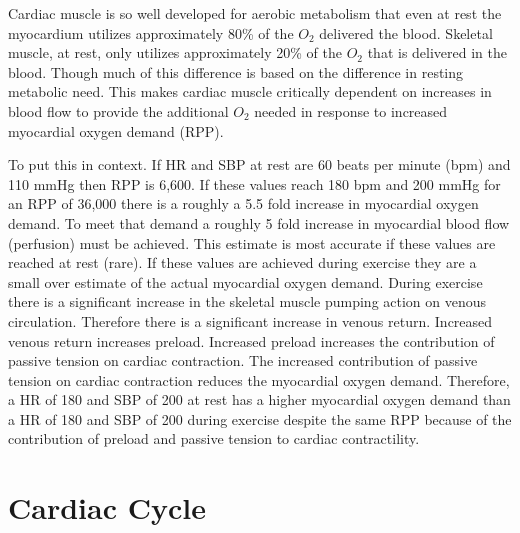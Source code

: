 Cardiac muscle is so well developed for aerobic metabolism that even at rest the myocardium utilizes approximately 80\% of the $O_2$ delivered the blood. Skeletal muscle, at rest, only utilizes approximately 20\% of the $O_2$ that is delivered in the blood. Though much of this difference is based on the difference in resting metabolic need. This makes cardiac muscle critically dependent on increases in blood flow to provide the additional $O_2$ needed in response to increased myocardial oxygen demand (RPP).

To put this in context. If HR and SBP at rest are 60 beats per minute (bpm) and 110 mmHg then RPP is 6,600. If these values reach 180 bpm and 200 mmHg for an RPP of 36,000 there is a roughly a 5.5 fold increase in myocardial oxygen demand. To meet that demand a roughly 5 fold increase in myocardial blood flow (perfusion) must be achieved. This estimate is most accurate if these values are reached at rest (rare). If these values are achieved during exercise they are a small over estimate of the actual myocardial oxygen demand. During exercise there is a significant increase in the skeletal muscle pumping action on venous circulation. Therefore there is a significant increase in venous return. Increased venous return increases preload. Increased preload increases the contribution of passive tension on cardiac contraction. The increased contribution of passive tension on cardiac contraction reduces the myocardial oxygen demand. 
Therefore, a HR of 180 and SBP of 200 at rest has a higher myocardial oxygen demand than a HR of 180 and SBP of 200 during exercise despite the same RPP because of the contribution of preload and passive tension to cardiac contractility.

\section{Cardiac Cycle}

